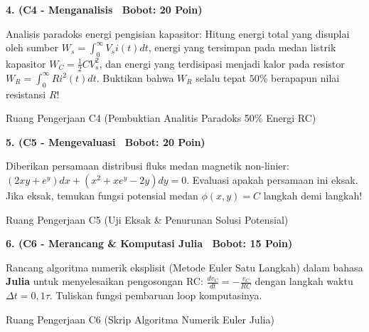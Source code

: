 \documentclass[10pt,a4paper]{article}
\begin{document}
\noindent\textbf{4. (C4 - Menganalisis \textbar\ Bobot: 20 Poin)}\par\vspace{0.5mm}
{\footnotesize Analisis paradoks energi pengisian kapasitor: Hitung energi total yang disuplai oleh sumber $W_s = \int_0^\infty V_s i(t) dt$, energi yang tersimpan pada medan listrik kapasitor $W_C = \frac{1}{2} C V_s^2$, dan energi yang terdisipasi menjadi kalor pada resistor $W_R = \int_0^\infty R i^2(t) dt$. Buktikan bahwa $W_R$ selalu tepat $50\%$ berapapun nilai resistansi $R$!}
\begin{answerbox}{Ruang Pengerjaan C4 (Pembuktian Analitis Paradoks 50\% Energi RC)}
  \vspace{3.8cm}
\end{answerbox}

\vspace{1.5mm}

\noindent\textbf{5. (C5 - Mengevaluasi \textbar\ Bobot: 20 Poin)}\par\vspace{0.5mm}
{\footnotesize Diberikan persamaan distribusi fluks medan magnetik non-linier: $(2x y + e^y)dx + (x^2 + x e^y - 2y)dy = 0$. Evaluasi apakah persamaan ini eksak. Jika eksak, temukan fungsi potensial medan $\phi(x,y) = C$ langkah demi langkah!}
\begin{answerbox}{Ruang Pengerjaan C5 (Uji Eksak \& Penurunan Solusi Potensial)}
  \vspace{3.8cm}
\end{answerbox}

\vspace{1.5mm}

\noindent\textbf{6. (C6 - Merancang \& Komputasi Julia \textbar\ Bobot: 15 Poin)}\par\vspace{0.5mm}
{\footnotesize Rancang algoritma numerik eksplisit (Metode Euler Satu Langkah) dalam bahasa \textbf{Julia} untuk menyelesaikan pengosongan RC: $\frac{dv_C}{dt} = -\frac{v_C}{RC}$ dengan langkah waktu $\Delta t = 0{,}1\tau$. Tuliskan fungsi pembaruan loop komputasinya.}
\begin{answerbox}{Ruang Pengerjaan C6 (Skrip Algoritma Numerik Euler Julia)}
  \vspace{3.8cm}
\end{answerbox}

\vspace{1.5mm}
\end{document}
